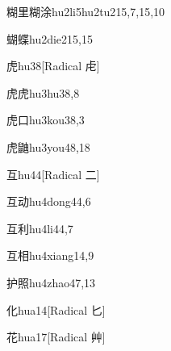 \begin{entry}{糊里糊涂}{hu2li5hu2tu2}{15,7,15,10}
\end{entry}

\begin{entry}{蝴蝶}{hu2die2}{15,15}
\end{entry}

\begin{entry}{虎}{hu3}{8}[Radical ⾌]
\end{entry}

\begin{entry}{虎虎}{hu3hu3}{8,8}
\end{entry}

\begin{entry}{虎口}{hu3kou3}{8,3}
\end{entry}

\begin{entry}{虎鼬}{hu3you4}{8,18}
\end{entry}

\begin{entry}{互}{hu4}{4}[Radical ⼆]
\end{entry}

\begin{entry}{互动}{hu4dong4}{4,6}
\end{entry}

\begin{entry}{互利}{hu4li4}{4,7}
\end{entry}

\begin{entry}{互相}{hu4xiang1}{4,9}
\end{entry}

\begin{entry}{护照}{hu4zhao4}{7,13}
\end{entry}

\begin{entry}{化}{hua1}{4}[Radical 匕]
\end{entry}

\begin{entry}{花}{hua1}{7}[Radical 艸]
\end{entry}

